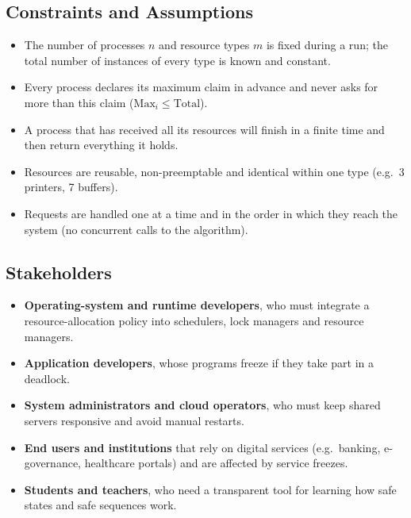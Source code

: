 \documentclass[11pt,a4paper]{report}
\begin{document}
\subsection{Constraints and Assumptions}
\begin{itemize}
    \item The number of processes $n$ and resource types $m$ is fixed during a run; the total number of instances of every type is known and constant.
    \item Every process declares its maximum claim in advance and never asks for more than this claim ($\text{Max}_i \le \text{Total}$).
    \item A process that has received all its resources will finish in a finite time and then return everything it holds.
    \item Resources are reusable, non-preemptable and identical within one type (e.g.\ 3 printers, 7 buffers).
    \item Requests are handled one at a time and in the order in which they reach the system (no concurrent calls to the algorithm).
\end{itemize}

\subsection{Stakeholders}
\begin{itemize}
    \item \textbf{Operating-system and runtime developers}, who must integrate a resource-allocation policy into schedulers, lock managers and resource managers.
    \item \textbf{Application developers}, whose programs freeze if they take part in a deadlock.
    \item \textbf{System administrators and cloud operators}, who must keep shared servers responsive and avoid manual restarts.
    \item \textbf{End users and institutions} that rely on digital services (e.g.\ banking, e-governance, healthcare portals) and are affected by service freezes.
    \item \textbf{Students and teachers}, who need a transparent tool for learning how safe states and safe sequences work.
\end{itemize}
\end{document}
